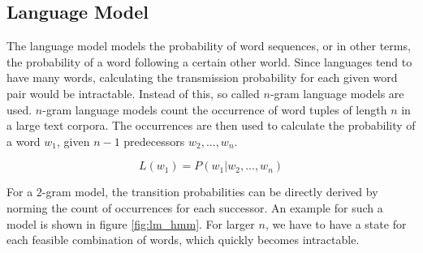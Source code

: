 \subsection{Language Model}
\label{sec:language_model}
The language model models the probability of word sequences, or in other terms, the probability of a word following a certain other world. Since languages tend to have many words, calculating the transmission probability for each given word pair would be intractable. Instead of this, so called $n$-gram language models are used. $n$-gram language models count the occurrence of word tuples of length $n$ in a large text corpora. The occurrences are then used to calculate the probability of a word $w_1$, given $n - 1$ predecessors $w_2, ..., w_n$.

\[
L(w_1) = P(w_1|w_2,...,w_n)
\]

For a $2$-gram model, the transition probabilities can be directly derived by norming the count of occurrences for each successor. An example for such a model is shown in figure \ref{fig:lm_hmm}. For larger $n$, we have to have a state for each feasible combination of words, which quickly becomes intractable. 

\begin{minipage}{\linewidth}
	\label{fig:lm_hmm}
	\hspace{1cm}
\end{minipage}


